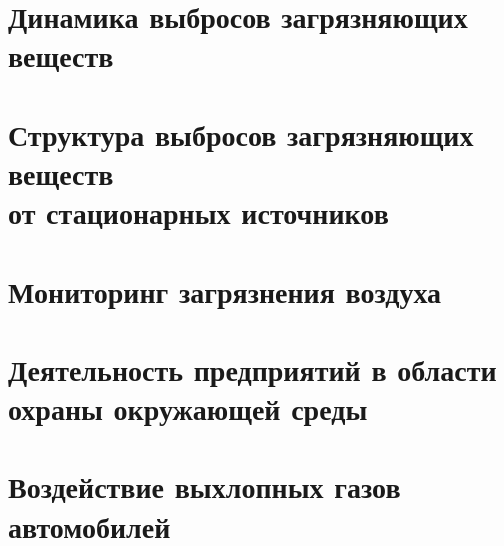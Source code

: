 







\section{Динамика выбросов загрязняющих веществ}
\begin{frame}{\insertsectionhead}
\end{frame}

\section{Структура выбросов загрязняющих веществ \\ от
стационарных источников}
\begin{frame}{\insertsectionhead}
\end{frame}

\section{Мониторинг загрязнения воздуха}
\begin{frame}{\insertsectionhead}
\end{frame}

\section{Деятельность предприятий в области \\ охраны окружающей среды}
\begin{frame}{\insertsectionhead}
\end{frame}

\section{Воздействие выхлопных газов автомобилей}
\begin{frame}{\insertsectionhead}
\end{frame}




